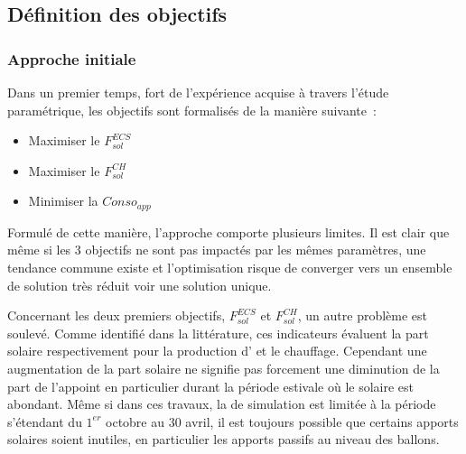 \subsection{Définition des objectifs} %
\label{sub:definition_des_objectifs}
\subsubsection{Approche initiale} %
\label{ssub:approche_initiale}
\noindent Dans un premier temps, fort de l’expérience acquise à travers l’étude paramétrique,
les objectifs sont formalisés de la manière suivante~:
\begin{itemize}
  \item Maximiser le $F_{sol}^{ECS}$
  \item Maximiser le $F_{sol}^{CH}$
  \item Minimiser la $Conso_{app}$
\end{itemize}

Formulé de cette manière, l’approche comporte plusieurs limites. Il est clair que même si
les \num{3} objectifs ne sont pas impactés par les mêmes paramètres, une tendance commune
existe et l’optimisation risque de converger vers un ensemble de solution très réduit voir
une solution unique.

Concernant les deux premiers objectifs, $F_{sol}^{ECS}$ et $F_{sol}^{CH}$, un autre
problème est soulevé. Comme identifié dans la littérature, ces indicateurs évaluent la
part solaire respectivement pour la production d’ et le chauffage. Cependant une
augmentation de la part solaire ne signifie pas forcement une diminution de la part de
l’appoint en particulier durant la période estivale où le solaire est abondant. Même si
dans ces travaux, la de simulation est limitée à la période s’étendant du $1^{er}$ octobre
au $30$ avril, il est toujours possible que certains apports solaires soient inutiles, en
particulier les apports passifs au niveau des ballons.

